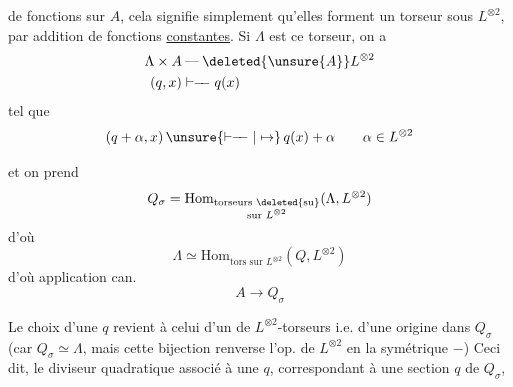 de fonctions  sur $A$,
cela signifie simplement qu'elles
forment un torseur sous $L^{\otimes 2}$, par
addition de fonctions \uline{constantes}.
Si $\Lambda$ est ce torseur, on a
\[
\begin{aligned}
\Lambda\times A&\mathbin{\text{---}}\deleted{\unsure{A}}L^{\otimes 2}\\
(q,x)&\mathrel{\vdash\!\!-\!\!-}q(x)
\end{aligned}
\]
tel que
\[
(q+\alpha,x)\,\unsure{\mathrel{\vdash\!\!-\!\!-}|\mapsto}\,q(x)+\alpha\qquad\alpha\in L^{\otimes 2}
\]

et on prend
\[
Q_\sigma=\mathrm{Hom}_{\substack{\text{torseurs }\deleted{\text{su}}\\\text{sur }L^{\otimes 2}}}(\Lambda,L^{\otimes 2})
\]
d'où
\[
\Lambda\simeq\mathrm{Hom}_{\text{tors sur }L^{\otimes 2}}(Q,L^{\otimes2})
\]
d'où  application can.
\[
A\longrightarrow Q_\sigma
\]

Le choix d'une $q$ \inserted{$\in\Lambda$} revient à celui
d'un  de $L^{\otimes 2}$-torseurs i.e. d'une
origine dans $Q_\sigma$ (car $Q_\sigma\simeq\Lambda$,
mais cette bijection renverse l'op.
de $L^{\otimes 2}$ en la symétrique $-$) Ceci dit,
le diviseur quadratique  associé à une
$q$, correspondant à une section $q$ de $Q_\sigma$,
